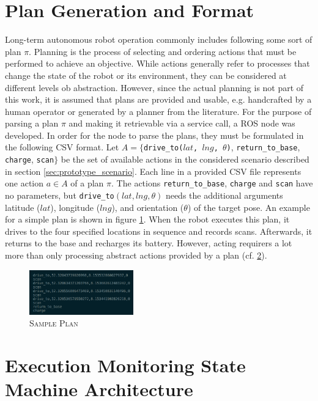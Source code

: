 \documentclass[english, master, utf8]{base/thesis_KBS}
\newcommand{\code}[1]{\colorbox{light-gray}{\texttt{#1}}}
\begin{document}
\section{Plan Generation and Format}
\label{sec:plan_generation}

Long-term autonomous robot operation commonly includes following some sort of plan $\pi$. Planning is the process of selecting and ordering actions that must be performed to
achieve an objective. \cite{GNT:2016} While actions generally refer to processes that change the state of the robot or its environment, they can be considered at different
levels ob abstraction. \cite{Ingrand:2017} However, since the actual planning is not part of this work, it is assumed that
plans are provided and usable, e.g. handcrafted by a human operator or generated by a planner from the literature.
For the purpose of parsing a plan $\pi$ and making it retrievable via a service call, a ROS node was developed.
In order for the node to parse the plans, they must be formulated in the following CSV format.
Let $A = \{$\code{drive\_to($lat$, $lng$, $\theta$)}, \code{return\_to\_base}, \code{charge}, \code{scan}$\}$ be the set of available actions in the considered scenario
described in section \ref{sec:prototype_scenario}.
Each line in a provided CSV file represents one action $a \in A$ of a plan $\pi$. The actions \code{return\_to\_base}, \code{charge} and \code{scan} have no parameters,
but \code{drive\_to$(lat, lng, \theta)$} needs the additional arguments latitude ($lat$), longitude ($lng$), and orientation ($\theta$) of the target pose.
An example for a simple plan is shown in figure \ref{fig:plan_example}. 
When the robot executes this plan, it drives to the four specified locations in sequence and records scans.
Afterwards, it returns to the base and recharges its battery. However, acting requirers a lot more than only processing abstract actions provided by a plan (cf. 
\ref{sec:execution_monitoring_smach_architecture}). \cite{Ingrand:2017}
\begin{figure}[H]
    \centering
    \includegraphics[width=0.4\textwidth]{pics/plan_example.png}
    \caption{\textsc{Sample Plan}}
    \label{fig:plan_example}
\end{figure}
\noindent

\section{Execution Monitoring State Machine Architecture}
\label{sec:execution_monitoring_smach_architecture}
\end{document}
